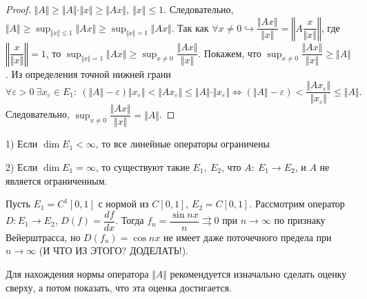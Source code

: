 \begin{proof}
$\displaystyle \Vert A\Vert \geqslant \Vert A\Vert \cdotp \Vert x\Vert \geqslant \Vert Ax\Vert ,\ \Vert x\Vert \leqslant 1$. Следовательно, $\displaystyle \Vert A\Vert \geqslant \sup _{\Vert x\Vert \leqslant 1}\Vert Ax\Vert \geqslant \sup _{\Vert x\Vert =1}\Vert Ax\Vert $. Так как $\displaystyle \forall x\neq 0\hookrightarrow \dfrac{\Vert Ax\Vert }{\Vert x\Vert } =\left\Vert A\dfrac{x}{\Vert x\Vert }\right\Vert $, где $\displaystyle \left\Vert \dfrac{x}{\Vert x\Vert }\right\Vert =1$, то $\displaystyle \sup _{\Vert x\Vert =1}\Vert Ax\Vert \geqslant \sup _{x\neq 0}\dfrac{\Vert Ax\Vert }{\Vert x\Vert }$. Покажем, что $\displaystyle \sup _{x\neq 0}\dfrac{\Vert Ax\Vert }{\Vert x\Vert } \geqslant \Vert A\Vert $. Из определения точной нижней грани
\begin{equation*}
\forall \varepsilon  >0\ \exists x_{\varepsilon } \in E_{1} :\ (\Vert A\Vert -\varepsilon )\Vert x_{\varepsilon }\Vert < \Vert Ax_{\varepsilon }\Vert \leqslant \Vert A\Vert \cdotp \Vert x_{\varepsilon }\Vert \Leftrightarrow (\Vert A\Vert -\varepsilon ) < \dfrac{\Vert Ax_{\varepsilon }\Vert }{\Vert x_{\varepsilon }\Vert } \leqslant \Vert A\Vert .
\end{equation*}
Следовательно, $\displaystyle \sup _{x\neq 0}\dfrac{\Vert Ax\Vert }{\Vert x\Vert } =\Vert A\Vert $.
\end{proof}
\begin{note}
1) Если $\displaystyle \dim E_{1} < \infty $, то все линейные операторы ограничены

2) Если $\displaystyle \dim E_{1} =\infty $, то существуют такие $\displaystyle E_{1} ,\ E_{2}$, что $\displaystyle A:\ E_{1}\rightarrow E_{2}$, и $\displaystyle A$ не является ограниченным.
\end{note}
\begin{example}
Пусть $\displaystyle E_{1} =C^{1}[ 0,1]$ с нормой из $\displaystyle C[ 0,1]$, $\displaystyle E_{2} =C[ 0,1]$. Рассмотрим оператор $\displaystyle D:E_{1}\rightarrow E_{2}$, $\displaystyle D( f) =\dfrac{df}{dx}$. Тогда $\displaystyle f_{n} =\dfrac{\sin nx}{n} \rightrightarrows 0$ при $\displaystyle n\rightarrow \infty $ по признаку Вейерштрасса, но $\displaystyle D( f_{n}) =\cos nx$ не имеет даже поточечного предела при $\displaystyle n\rightarrow \infty $ (И ЧТО ИЗ ЭТОГО? ДОДЕЛАТЬ!).
\end{example}
\begin{note}
Для нахождения нормы оператора $\displaystyle \Vert A\Vert $ рекомендуется изначально сделать оценку сверху, а потом показать, что эта оценка достигается.
\end{note}

